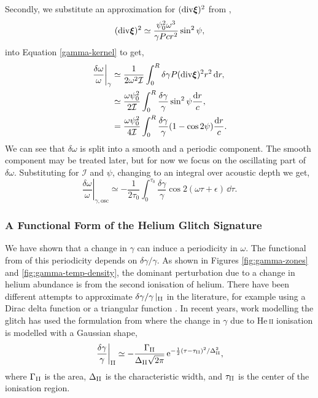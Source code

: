 Secondly, we substitute an approximation for \((\mathrm{div} \bm{\xi})^2\) from \citet{Gough1993},
%
\begin{equation}
    (\mathrm{div} \bm{\xi})^2 \simeq \frac{\psi_0^2 \omega^3}{\gamma P c r^2} \sin^2\psi, \label{eq:div-xi}
\end{equation}
%
into Equation \ref{gamma-kernel} to get,
%
\begin{align}
    \left.\frac{\delta\omega}{\omega}\right|_\gamma &\simeq \frac{1}{2\omega^2\mathcal{I}} \int_0^{R} \delta\gamma P (\mathrm{div} \bm{\xi})^2 r^2 \, \mathrm{d} r, \notag \\
    &\simeq \frac{\omega \psi_0^2}{2 \mathcal{I}} \int_0^{R} \frac{\delta\gamma}{\gamma}\sin^2\psi\frac{\mathrm{d} r}{c}, \notag \\
    &= \frac{\omega \psi_0^2}{4 \mathcal{I}} \int_0^{R} \frac{\delta\gamma}{\gamma}(1 - \cos 2\psi)\frac{\mathrm{d} r}{c}.
\end{align}
%
We can see that \(\delta\omega\) is split into a smooth and a periodic component. The smooth component may be treated later, but for now we focus on the oscillating part of \(\delta\omega\). Substituting for \(\mathcal{I}\) and \(\psi\), changing to an integral over acoustic depth we get,
%
\begin{equation}
    \left.\frac{\delta\omega}{\omega}\right|_{\gamma,\mathrm{osc}} \simeq - \frac{1}{2\tau_0} \int_0^{\tau_0} \frac{\delta\gamma}{\gamma} \cos 2 (\omega\tau + \epsilon) \, \dd \tau. \label{eq:omega-osc}
\end{equation}
%

\subsubsection{A Functional Form of the Helium Glitch Signature}

We have shown that a change in \(\gamma\) can induce a periodicity in \(\omega\). The functional from of this periodicity depends on \(\delta\gamma/\gamma\). As shown in Figures \ref{fig:gamma-zones} and \ref{fig:gamma-temp-density}, the dominant perturbation due to a change in helium abundance is from the second ionisation of helium. There have been different attempts to approximate \(\delta\gamma/\gamma\,|_{{\mathrm{II}}}\) in the literature, for example using a Dirac delta function or a triangular function \citep{Monteiro.Christensen-Dalsgaard.ea1994, Monteiro.Thompson2005}. In recent years, work modelling the glitch has used the formulation from \citet{Houdek.Gough2007} where the change in \(\gamma\) due to He\,\textsc{ii} ionisation is modelled with a Gaussian shape,
%
\begin{equation}
    \left.\frac{\delta\gamma}{\gamma}\right|_{{\mathrm{II}}} \simeq - \frac{\Gamma_{{\mathrm{II}}}}{\Delta_{{\mathrm{II}}} \sqrt{2\pi}} \, \mathrm{e}^{- \frac12{(\tau - \tau_{{\mathrm{II}}})^2}/{\Delta_{{\mathrm{II}}}^2} }, \label{eq:he-gamma}
\end{equation}
%
where \(\Gamma_{{\mathrm{II}}}\) is the area, \(\Delta_{{\mathrm{II}}}\) is the characteristic width, and \(\tau_{{\mathrm{II}}}\) is the center of the ionisation region.

